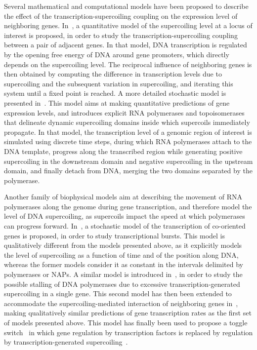Several mathematical and computational models have been proposed to describe the effect of the transcription-supercoiling coupling on the expression level of neighboring genes.
In~\cite{meyer2014}, a quantitative model of the supercoiling level at a locus of interest is proposed, in order to study the transcription-supercoiling coupling between a pair of adjacent genes.
In that model, DNA transcription is regulated by the opening free energy of DNA around gene promoters, which directly depends on the supercoiling level.
The reciprocal influence of neighboring genes is then obtained by computing the difference in transcription levels due to supercoiling and the subsequent variation in supercoiling, and iterating this system until a fixed point is reached.
A more detailed stochastic model is presented in~\cite{elhoudaigui2019}.
This model aims at making quantitative predictions of gene expression levels, and introduces explicit RNA polymerases and topoisomerases that delineate dynamic supercoiling domains inside which supercoils immediately propagate.
In that model, the transcription level of a genomic region of interest is simulated using discrete time steps, during which RNA polymerases attach to the DNA template, progress along the transcribed region while generating positive supercoiling in the downstream domain and negative supercoiling in the upstream domain, and finally detach from DNA, merging the two domains separated by the polymerase.

Another family of biophysical models aim at describing the movement of RNA polymerases along the genome during gene transcription, and therefore model the level of DNA supercoiling, as supercoils impact the speed at which polymerases can progress forward.
In~\cite{brackley2016}, a stochastic model of the transcription of co-oriented genes is proposed, in order to study transcriptional bursts.
This model is qualitatively different from the models presented above, as it explicitly models the level of supercoiling as a function of time and of the position along DNA, whereas the former models consider it as constant in the intervals delimited by polymerases or NAPs.
A similar model is introduced in~\cite{sevier2017}, in order to study the possible stalling of DNA polymerases due to excessive transcription-generated supercoiling in a single gene.
This second model has then been extended to accommodate the supercoiling-mediated interaction of neighboring genes in~\cite{sevier2018}, making qualitatively similar predictions of gene transcription rates as the first set of models presented above.
This model has finally been used to propose a toggle switch~\citep{gardner2000} in which gene regulation by transcription factors is replaced by regulation by transcription-generated supercoiling~\citep{sevier2021}.

